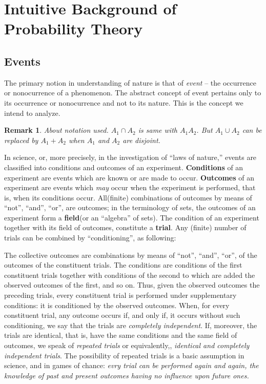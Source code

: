 \documentclass[a4paper]{book}
\newtheorem{remark}{Remark}[section]
\begin{document}
  \section{Intuitive Background of Probability Theory}

    \subsection{Events}

    The primary notion in understanding of nature is that of
    \textit{event} -- the occurrence or nonocurrence of a phenomenon.
    The abstract concept of event pertains only to its occurrence or
    nonocurrence and not to its nature. This is the concept we intend to
    analyze.\cite{1977probability}

    \begin{remark} About notation used. $A_1 \cap A_2$ is same with
      $A_1A_2$. But $A_1 \cup A_2$ can be replaced by $A_1 + A_2$ when
      $A_1$ and $A_2$ are disjoint.  \end{remark}

    In science, or, more precisely, in the investigation of ``laws of
    nature,'' events are classified into conditions and outcomes of an
    experiment. \textbf{Conditions} of an experiment are events which
    are known or are made to occur. \textbf{Outcomes} of an experiment
    are events which \textit{may} occur when the experiment is
    performed, that is, when its conditions occur. All(finite)
    combinations of outcomes by means of ``not'', ``and'', ``or'', are
    outcomes; in the terminology of sets, the outcomes of an experiment
    form a \textbf{field}(or an ``algebra'' of sets). The condition of
    an experiment together with its field of outcomes, constitute a
    \textbf{trial}. Any (finite) number of trials can be combined by
    ``conditioning'', as following:

    The collective outcomes are combinations by means of ``not'',
    ``and'', ``or'', of the outcomes of the constituent trials. The
    conditions are conditions of the first constituent trials together
    with conditions of the second to which are added the observed
    outcomes of the first, and so on. Thus, given the observed outcomes
    the preceding trials, every constituent trial is performed under
    supplementary conditions: it is conditioned by the observed
    outcomes. When, for every constituent trial, any outcome occurs if,
    and only if, it occurs without such conditioning, we say that the
    trials are \textit{completely independent}. If, moreover, the trials
    are identical, that is, have the same conditions and the same field
    of outcomes, we speak of \textit{repeated trials} or equivalently,,
    \textit{identical and completely independent trials}. The
    possibility of repeated trials is a basic assumption in science, and
    in games of chance: \textit{evry trial can be performed again and
      again, the knowledge of past and present outcomes having no
      influence upon future ones.}\cite{1977probability}
\end{document}
